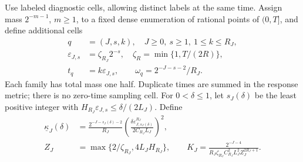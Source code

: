 Use labeled diagnostic cells, allowing distinct labels at the same time.
Assign mass \(2^{-m-1}\), \(m\ge1\), to a fixed dense enumeration of
rational points of \((0,T]\), and define additional cells
\begin{equation}
\begin{aligned}
 q&=(J,s,k),\quad J\ge0,\ s\ge1,\ 1\le k\le R_J,\\
 \varepsilon_{J,s}&=\zeta_{R_J}2^{-s},\quad \zeta_R=\min\{1,T/(2R)\},\\
 t_q&=k\varepsilon_{J,s},\qquad \omega_q=2^{-J-s-2}/R_J.
\end{aligned}
 \label{eq:multiscale-design}
\end{equation}
Each family has total mass one half. Duplicate times are summed in the
response metric; there is no zero-time sampling cell.
For \(0<\delta\le1\), let \(s_J(\delta)\) be the least positive integer
with \(H_{R_J}\varepsilon_{J,s}\le\delta/(2L_J)\). Define
\begin{align}
 \underline\kappa_J(\delta)&=
 \frac{2^{-J-s_J(\delta)-2}}{R_J}
 \left(\frac{\delta\varepsilon_{J,s_J(\delta)}^{R_J}}
 {2C_{R_J}L_J}\right)^2,\label{eq:effective-kappa}\\
 Z_J&=\max\{2/\zeta_{R_J},4L_JH_{R_J}\},\qquad
 K_J=\frac{2^{-J-4}}{R_J\zeta_{R_J}C_{R_J}^2L_J^2Z_J^{2R_J+1}}.
 \label{eq:explicit-kappa-prefactor}
\end{align}

